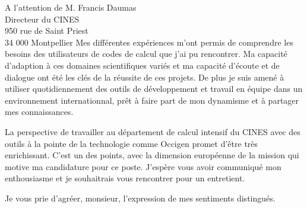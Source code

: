 \documentclass[10pt,a4paper]{lettre}
\begin{document}
\begin{letter}{A l'attention de M. Francis Daumas\\Directeur du CINES\\950 rue de Saint Priest\\34 000 Montpellier}
{Mes différentes expériences m'ont permis de comprendre les besoins des
utilisateurs de codes de calcul que j'ai pu rencontrer. Ma capacité
d'adaption à ces domaines scientifiques variés et ma capacité
d'écoute et de dialogue ont été les clés de la réussite de ces projets.
De plus je suis amené à utiliser quotidiennement des outils de
développement et travail en équipe dans un environnement internationnal,
prêt à faire part de mon dynamisme et à partager mes connaissances.
}

{
La perspective de travailler au département de calcul intensif du CINES
avec des outils à la pointe de la technologie comme Occigen promet
d'être très enrichissant.
C'est un des points, avec la dimension européenne de la mission qui
motive ma candidature pour ce poste.
J'espère vous avoir communiqué mon enthousiasme et je souhaitrais vous
rencontrer pour un entretient.
}

\closing{Je vous prie d'agréer, monsieur, l'expression de mes sentiments distingués.}
\end{letter}
\end{document}
